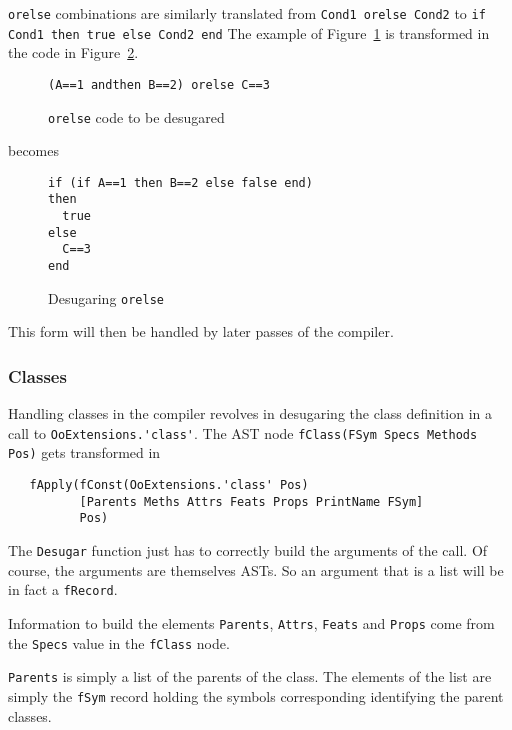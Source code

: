 \documentclass[a4paper]{memoir}
\begin{document}
\lstinline!orelse! combinations are similarly translated from \lstinline!Cond1 orelse Cond2! to \lstinline!if Cond1 then true else Cond2 end!  
The example of Figure~\ref{fig:desugar:orelsesrc} is transformed in the code in
Figure~\ref{fig:desugar:orelse}.
\begin{figure}[h]
\begin{lstlisting}
(A==1 andthen B==2) orelse C==3
\end{lstlisting}
\caption{\lstinline!orelse! code to be desugared}
\label{fig:desugar:orelsesrc}
\end{figure}

becomes

\begin{figure}[h]
\begin{lstlisting}
if (if A==1 then B==2 else false end)
then
  true
else
  C==3
end
\end{lstlisting}
\caption{Desugaring \lstinline!orelse!}
\label{fig:desugar:orelse}
\end{figure}


This form will then be handled by later passes of the compiler.
\subsubsection{Classes}\label{sec:arch:desugar:classes}
Handling classes in the
compiler revolves in desugaring the class definition in a call to
\lstinline!OoExtensions.'class'!. 
The AST node \lstinline!fClass(FSym Specs Methods Pos)! gets transformed in 
\begin{lstlisting}
   fApply(fConst(OoExtensions.'class' Pos) 
          [Parents Meths Attrs Feats Props PrintName FSym] 
          Pos)
\end{lstlisting}

The \lstinline!Desugar! function just has to correctly build the arguments of
the call. Of course, the arguments are themselves ASTs. So an argument that is a
list will be in fact a \lstinline!fRecord!.

Information to build the elements \lstinline!Parents!, \lstinline!Attrs!,
\lstinline!Feats! and \lstinline!Props! come from the \lstinline!Specs! value in
the \lstinline!fClass! node.

\lstinline!Parents! is simply a list of the parents of the class. The elements
of the list are simply the \lstinline!fSym! record holding the symbols
corresponding identifying the parent classes.
\end{document}
